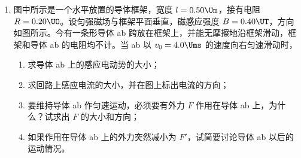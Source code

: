 \documentclass[\gkver]{gaokaozhenti}
\begin{document}
\begin{enumerate}
{$v=\sqrt{u^{2}-2gh}=\sqrt{6^{2}-2\times10\times1.0}\Ums$（1 分）

$=4.0\Ums$（1 分）

小车在 D 点所受重力 $G$【等于 $(M+m)g$】和支持力 $N$ 的合力就是向心力，有：

$(M+m)g-N=\frac{(M+m)v^{2}}{R}$（1 分）

$N=(M+m)(g-\frac{v^{2}}{R})=(60+20)(10-\frac{16}{32})\UN$（1 分）

$=760\UN$（1 分）

小车对轨道的压力跟小车所受的支持力大小相等，方向相反，即大小也为 $760\UN$。（如只算小车质量，其余部分都正确而算出压力是 $190\UN$ 的，该最后 4 分中只给 2 分。）
}

\item
图中所示是一个水平放置的导体框架，宽度 $l=0.50\Um$，接有电阻 $R=0.20\UO$。设匀强磁场与框架平面垂直，磁感应强度 $B=0.40\UT$，方向如图所示。今有一条形导体 ab 跨放在框架上，并能无摩擦地沿框架滑动，框架和导体 ab 的电阻均不计。当 ab 以 $v_{0}=4.0\Ums$ 的速度向右匀速滑动时，
\begin{enumerate}
	\item
	求导体 ab 上的感应电动势的大小；
	\item
	求回路上感应电流的大小，并在图上标出电流的方向；
	\item
	要维持导体 ab 作匀速运动，必须要有外力 $F$ 作用在导体 ab 上，为什么？试求出 $F$ 的大小和方向；
	\item
	如果作用在导体 ab 上的外力突然减小为 $F'$，试简要讨论导体 ab 以后的运动情况。
\end{enumerate}
\onepicture[align=right, w=6.04cm]{}

\end{enumerate}
\end{document}
